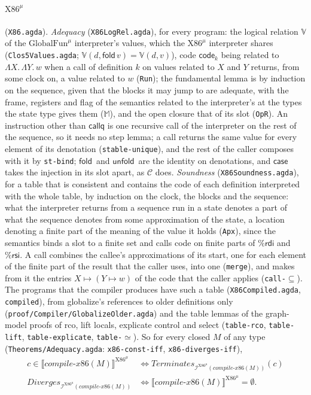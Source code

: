 \documentclass[10pt]{article}
\theoremstyle{acmplain}
\newcommand{\SEM}[1]{\llbracket #1 \rrbracket}
\newcommand{\key}[1]{\mathsf{#1}}
\newcommand{\pass}[1]{\mathit{#1}}
\newcommand{\Term}{\mathit{Terminates}}
\newcommand{\Div}{\mathit{Diverges}}
\newcommand{\codeV}[1]{\key{code}_{#1}}
\newcommand{\Interp}[1]{\mathcal{I}^{#1}}
\newcommand{\rdi}{\%\key{rdi}}
\newcommand{\rsi}{\%\key{rsi}}
\newcommand{\Ml}[1]{\textrm{#1}^{\mu}}                  %
\newcommand{\Mfold}{\key{fold}\,}
\newcommand{\Munfold}{\key{unfold}\,}
\begin{document}
\paragraph{$\Ml{X86}$} (\texttt{X86.agda}). \emph{Adequacy}
(\texttt{X86LogRel.agda}), for every program: the logical relation
$\mathbb{V}$ of the $\Ml{GlobalFun}$ interpreter's values, which the $\Ml{X86}$
interpreter shares (\texttt{Clos5Values.agda}; $\mathbb{V}(d, \Mfold v) =
\mathbb{V}(d, v)$), code $\codeV{k}$ being related to $\Lambda X.\, \Lambda
Y.\, w$ when a call of definition $k$ on values related to $X$ and $Y$
returns, from some clock on, a value related to $w$ (\texttt{Run}); the
fundamental lemma is by induction on the sequence, given that the blocks it
may jump to are adequate, with the frame, registers and flag of the
semantics related to the interpreter's at the types the state type gives them
(\texttt{$\mathbb{M}$}), and the open closure that of its slot
(\texttt{OpR}). An instruction other than $\key{callq}$ is one recursive
call of the interpreter on the rest of the sequence, so it needs no step
lemma; a call returns the same value for every element of its
denotation (\texttt{stable-unique}), and the rest of the caller composes
with it by \texttt{st-bind}; $\Mfold$ and $\Munfold$ are the identity on
denotations, and $\key{case}$ takes the injection in its slot apart, as
$\mathcal{C}$ does. \emph{Soundness} (\texttt{X86Soundness.agda}), for a
table that is consistent and contains the code of each definition
interpreted with the whole table, by induction on the clock, the blocks
and the sequence: what the interpreter returns from a sequence run in a
state denotes a part of what the sequence denotes from some
approximation of the state, a location denoting a finite part of the
meaning of the value it holds (\texttt{Apx}), since the semantics binds
a slot to a finite set and calls code on finite parts of $\rdi$ and
$\rsi$. A call combines the callee's approximations of its start, one
for each element of the finite part of the result that the caller uses,
into one (\texttt{merge}), and makes from it the entries $X \mapsto (Y
\mapsto w)$ of the code that the caller applies (\texttt{call-$\subseteq$}).
The programs that the compiler produces have such a
table (\texttt{X86Compiled.agda}, \texttt{compiled}), from globalize's
references to older definitions only
(\texttt{proof/Compiler/GlobalizeOlder.agda}) and the table lemmas of the
graph-model proofs of rco, lift locals, explicate control and select
(\texttt{table-rco}, \texttt{table-lift}, \texttt{table-explicate},
\texttt{table-$\simeq$}). So for every closed $M$ of any type
(\texttt{Theorems/\allowbreak Adequacy.agda}: \texttt{x86-const-iff}, \texttt{x86-diverges-iff}),
\begin{align*}
  c \in \SEM{\pass{compile\text{-}x86}(M)}^{\Ml{X86}} &\iff \Term_{\Interp{\Ml{X86}}(\pass{compile\text{-}x86}(M))}(c) \\
  \Div_{\Interp{\Ml{X86}}(\pass{compile\text{-}x86}(M))} &\iff \SEM{\pass{compile\text{-}x86}(M)}^{\Ml{X86}} = \emptyset .
\end{align*}
\end{document}
